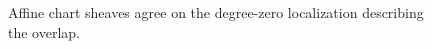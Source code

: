 \begin{figure}[ht]\centering
{}
\caption{Affine chart sheaves agree on the degree-zero localization describing the overlap.}\label{fig:vi35-05}\end{figure}